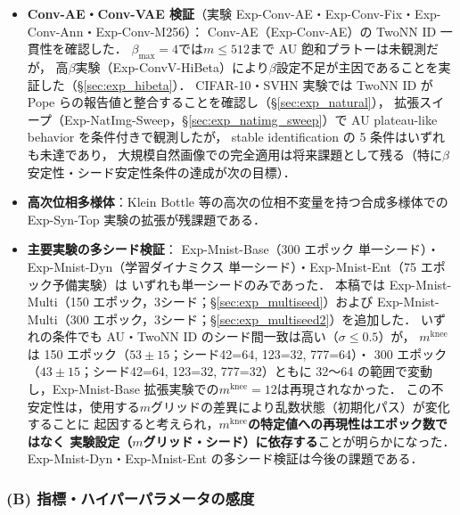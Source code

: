 \documentclass[11pt,a4paper]{jsarticle}
\newcommand{\mknee}{m^{\mathrm{knee}}}
\begin{document}
\begin{itemize}
  \item \textbf{Conv-AE・Conv-VAE 検証}（実験 Exp-Conv-AE・Exp-Conv-Fix・Exp-Conv-Ann・Exp-Conv-M256）：
        Conv-AE（Exp-Conv-AE）の TwoNN ID 一貫性を確認した．
        $\beta_{\max}=4$では$m \leq 512$まで AU 飽和プラトーは未観測だが，
        高$\beta$実験（Exp-ConvV-HiBeta）により$\beta$設定不足が主因であることを実証した（§\ref{sec:exp_hibeta}）．
        CIFAR-10・SVHN 実験では TwoNN ID が Pope ら\cite{pope2021intrinsic}の報告値と整合することを確認し（§\ref{sec:exp_natural}），
        拡張スイープ（Exp-NatImg-Sweep，§\ref{sec:exp_natimg_sweep}）で AU plateau-like behavior を条件付きで観測したが，
        stable identification の 5 条件はいずれも未達であり，
        大規模自然画像での完全適用は将来課題として残る（特に$\beta$安定性・シード安定性条件の達成が次の目標）．
  \item \textbf{高次位相多様体}：Klein Bottle 等の高次の位相不変量を持つ合成多様体での
        Exp-Syn-Top 実験の拡張が残課題である．
  \item \textbf{主要実験の多シード検証}：
        Exp-Mnist-Base（300 エポック 単一シード）・Exp-Mnist-Dyn（学習ダイナミクス 単一シード）・Exp-Mnist-Ent（75 エポック予備実験）は
        いずれも単一シードのみであった．
        本稿では Exp-Mnist-Multi（150 エポック，3シード；§\ref{sec:exp_multiseed}）および
        Exp-Mnist-Multi（300 エポック，3シード；§\ref{sec:exp_multiseed2}）を追加した．
        いずれの条件でも AU・TwoNN ID のシード間一致は高い（$\sigma \leq 0.5$）が，
        $\mknee$は 150 エポック（$53 \pm 15$；シード42=64, 123=32, 777=64）・
        300 エポック（$43 \pm 15$；シード42=64, 123=32, 777=32）ともに
        32〜64 の範囲で変動し，Exp-Mnist-Base 拡張実験での$\mknee = 12$は再現されなかった．
        この不安定性は，使用する$m$グリッドの差異により乱数状態（初期化パス）が変化することに
        起因すると考えられ，\textbf{$\mknee$の特定値への再現性はエポック数ではなく
        実験設定（$m$グリッド・シード）に依存する}ことが明らかになった．
        Exp-Mnist-Dyn・Exp-Mnist-Ent の多シード検証は今後の課題である．
\end{itemize}

\subsubsection*{(B) 指標・ハイパーパラメータの感度}
\end{document}
